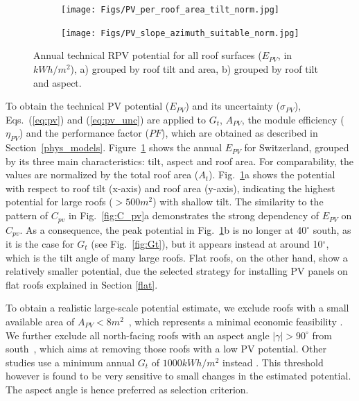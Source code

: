 \begin{figure}[tb]
\centering
\begin{subfigure}{.48\textwidth}
  \centering
  \texttt{[image: Figs/PV\_per\_roof\_area\_tilt\_norm.jpg]} 
  \subcaption{}
\end{subfigure}
\begin{subfigure}{.48\textwidth}
  \centering
  \texttt{[image: Figs/PV\_slope\_azimuth\_suitable\_norm.jpg]}
  \subcaption{}
\end{subfigure}
\caption{Annual technical RPV potential for all roof surfaces ($E_{PV}$, in $kWh/m^2$), a) grouped by roof tilt and area, b) grouped by roof tilt and aspect.}
\label{fig:pv_roof}
\end{figure}

To obtain the technical PV potential ($E_{PV}$) and its uncertainty ($\sigma_{PV}$), Eqs.~(\ref{eq:pv}) and (\ref{eq:pv_unc}) are applied to $G_t$, $A_{PV}$, the module efficiency ($\eta_{PV}$) and the performance factor ($PF$), which are obtained as described in Section~\ref{phys_models}.
%
Figure~\ref{fig:pv_roof} shows the annual $E_{PV}$ for Switzerland, grouped by its three main characteristics: tilt, aspect and roof area. For comparability, the values are normalized by the total roof area ($A_t$). 
Fig.~\ref{fig:pv_roof}a shows the potential with respect to roof tilt (x-axis) and roof area (y-axis), indicating the highest potential for large roofs ($>500m^2$) with shallow tilt. 
The similarity to the pattern of $C_{pv}$ in Fig.~\ref{fig:C_pv}a demonstrates the strong dependency of $E_{PV}$ on $C_{pv}$.
As a consequence, the peak potential in Fig.~\ref{fig:pv_roof}b is no longer at 40$^\circ$ south, as it is the case for $G_t$ (see Fig.~\ref{fig:Gt}), but it appears instead at around 10$^\circ$, which is the tilt angle of many large roofs. 
Flat roofs, on the other hand, show a relatively smaller potential, due the selected strategy for installing PV panels on flat roofs explained in Section \ref{flat}.

To obtain a realistic large-scale potential estimate, we exclude roofs with a small available area of $A_{PV}<8m^2$~\cite{assouline_large-scale_2018}, which represents a minimal economic feasibility \cite{assouline_quantifying_2017, assouline_large-scale_2018, portmann_sonnendach.ch:_2016, romero_rodriguez_assessment_2017}. 
We further exclude all north-facing roofs with an aspect angle $|\gamma| > 90^\circ$ from south~\cite{assouline_large-scale_2018, assouline_quantifying_2017}, which aims at removing those roofs with a low PV potential. Other studies use a minimum annual $G_t$ of $1000kWh/m^2$ instead \cite{buffat_scalable_2018, portmann_sonnendach.ch:_2016, romero_rodriguez_assessment_2017}. This threshold however is found to be very sensitive to small changes in the estimated potential. The aspect angle is hence preferred as selection criterion.

